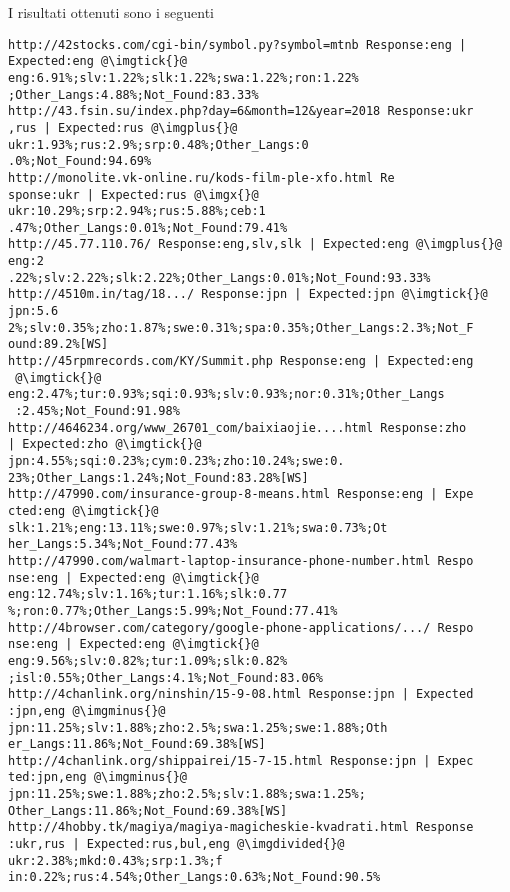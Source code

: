 \documentclass{article}
\begin{document}
I risultati ottenuti sono i seguenti 
\begin{verbatim}
http://42stocks.com/cgi-bin/symbol.py?symbol=mtnb Response:eng |
Expected:eng @\imgtick{}@ eng:6.91%;slv:1.22%;slk:1.22%;swa:1.22%;ron:1.22%
;Other_Langs:4.88%;Not_Found:83.33%
http://43.fsin.su/index.php?day=6&month=12&year=2018 Response:ukr
,rus | Expected:rus @\imgplus{}@ ukr:1.93%;rus:2.9%;srp:0.48%;Other_Langs:0
.0%;Not_Found:94.69%
http://monolite.vk-online.ru/kods-film-ple-xfo.html Re
sponse:ukr | Expected:rus @\imgx{}@ ukr:10.29%;srp:2.94%;rus:5.88%;ceb:1
.47%;Other_Langs:0.01%;Not_Found:79.41%
http://45.77.110.76/ Response:eng,slv,slk | Expected:eng @\imgplus{}@ eng:2
.22%;slv:2.22%;slk:2.22%;Other_Langs:0.01%;Not_Found:93.33%
http://4510m.in/tag/18.../ Response:jpn | Expected:jpn @\imgtick{}@ jpn:5.6
2%;slv:0.35%;zho:1.87%;swe:0.31%;spa:0.35%;Other_Langs:2.3%;Not_F
ound:89.2%[WS]
http://45rpmrecords.com/KY/Summit.php Response:eng | Expected:eng
 @\imgtick{}@ eng:2.47%;tur:0.93%;sqi:0.93%;slv:0.93%;nor:0.31%;Other_Langs
 :2.45%;Not_Found:91.98%
http://4646234.org/www_26701_com/baixiaojie....html Response:zho 
| Expected:zho @\imgtick{}@ jpn:4.55%;sqi:0.23%;cym:0.23%;zho:10.24%;swe:0.
23%;Other_Langs:1.24%;Not_Found:83.28%[WS]
http://47990.com/insurance-group-8-means.html Response:eng | Expe
cted:eng @\imgtick{}@ slk:1.21%;eng:13.11%;swe:0.97%;slv:1.21%;swa:0.73%;Ot
her_Langs:5.34%;Not_Found:77.43%
http://47990.com/walmart-laptop-insurance-phone-number.html Respo
nse:eng | Expected:eng @\imgtick{}@ eng:12.74%;slv:1.16%;tur:1.16%;slk:0.77
%;ron:0.77%;Other_Langs:5.99%;Not_Found:77.41%
http://4browser.com/category/google-phone-applications/.../ Respo
nse:eng | Expected:eng @\imgtick{}@ eng:9.56%;slv:0.82%;tur:1.09%;slk:0.82%
;isl:0.55%;Other_Langs:4.1%;Not_Found:83.06%
http://4chanlink.org/ninshin/15-9-08.html Response:jpn | Expected
:jpn,eng @\imgminus{}@ jpn:11.25%;slv:1.88%;zho:2.5%;swa:1.25%;swe:1.88%;Oth
er_Langs:11.86%;Not_Found:69.38%[WS]
http://4chanlink.org/shippairei/15-7-15.html Response:jpn | Expec
ted:jpn,eng @\imgminus{}@ jpn:11.25%;swe:1.88%;zho:2.5%;slv:1.88%;swa:1.25%;
Other_Langs:11.86%;Not_Found:69.38%[WS]
http://4hobby.tk/magiya/magiya-magicheskie-kvadrati.html Response
:ukr,rus | Expected:rus,bul,eng @\imgdivided{}@ ukr:2.38%;mkd:0.43%;srp:1.3%;f
in:0.22%;rus:4.54%;Other_Langs:0.63%;Not_Found:90.5%
\end{verbatim}

\printHistogram{}

\printTimeGraph{}
\end{document}
